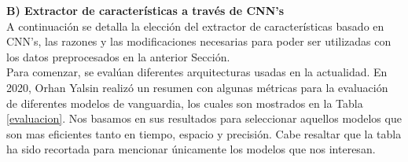 \textbf{B) Extractor de características a través de CNN's}\label{extraccion}\\

A continuación se detalla la elección del extractor de características
basado en CNN's, las razones y las modificaciones necesarias para 
poder ser utilizadas con los datos preprocesados en la anterior Sección.\\ 

Para comenzar, se evalúan diferentes arquitecturas usadas en la 
actualidad. En 2020, Orhan Yalsin \cite{DataModelos} realizó un resumen 
con algunas métricas para la evaluación de diferentes 
modelos de vanguardia, los cuales son mostrados 
en la Tabla \ref{evaluacion}. Nos basamos en sus resultados 
para seleccionar aquellos modelos que son mas eficientes 
tanto en tiempo, espacio y precisión. Cabe resaltar que la 
tabla ha sido recortada para mencionar únicamente los modelos que nos interesan.\\

